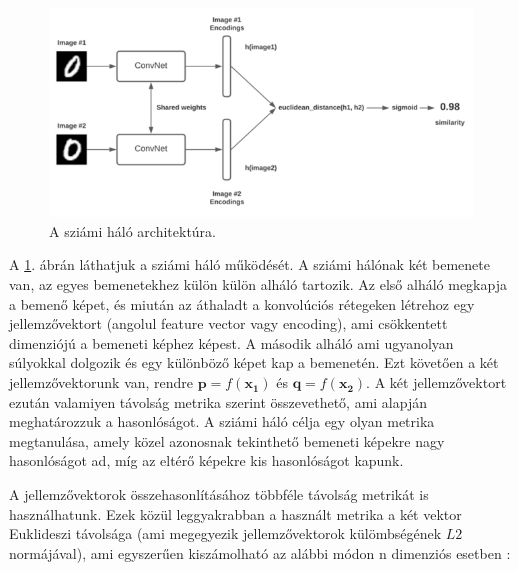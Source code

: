 
\begin{figure}[ht]
	\centering
	\includegraphics[width=1\columnwidth]{figures/siamese.png}
	\caption{A sziámi háló architektúra.}
	\label{fig:siamese}
\end{figure}

A \ref{fig:siamese}. ábrán láthatjuk a sziámi háló működését. A sziámi hálónak két bemenete van, az egyes bemenetekhez külön külön alháló tartozik. Az első alháló megkapja a bemenő képet, és miután az áthaladt a konvolúciós rétegeken létrehoz egy jellemzővektort (angolul feature vector vagy encoding), ami csökkentett dimenziójú a bemeneti képhez képest. A második alháló ami ugyanolyan súlyokkal dolgozik és egy különböző képet kap a bemenetén. Ezt követően a két jellemzővektorunk van, rendre $\mathbf{p} = f(\mathbf{x_1})$ és $\mathbf{q} = f(\mathbf{x_2})$. A két jellemzővektort ezután valamiyen távolság metrika szerint összevethető, ami alapján meghatározzuk a hasonlóságot. A sziámi háló célja egy olyan metrika megtanulása, amely közel azonosnak tekinthető bemeneti képekre nagy hasonlóságot ad, míg az eltérő képekre kis hasonlóságot kapunk.

A jellemzővektorok összehasonlításához többféle távolság metrikát is használhatunk. Ezek közül leggyakrabban a használt metrika a két vektor Euklideszi távolsága (ami megegyezik jellemzővektorok külömbségének $L2$ normájával), ami egyszerűen kiszámolható az alábbi módon n dimenziós esetben \cite{tabak2014geometry}:

